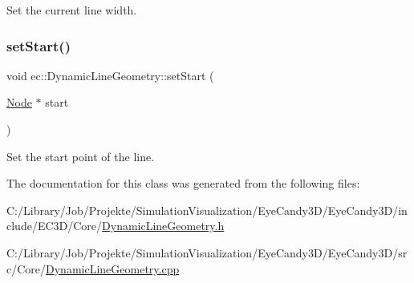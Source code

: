 Set the current line width. 

\mbox{\label{classec_1_1_dynamic_line_geometry_a7354615fc961c1d6d6e9ec09bdb5bdf9}} 
\subsubsection{\texorpdfstring{set\+Start()}{setStart()}}
{\footnotesize\ttfamily void ec\+::\+Dynamic\+Line\+Geometry\+::set\+Start (\begin{DoxyParamCaption}\item[{\mbox{\hyperlink{classec_1_1_node}{Node}} $\ast$}]{start }\end{DoxyParamCaption})}



Set the start point of the line. 



The documentation for this class was generated from the following files\+:\begin{DoxyCompactItemize}
\item 
C\+:/\+Library/\+Job/\+Projekte/\+Simulation\+Visualization/\+Eye\+Candy3\+D/\+Eye\+Candy3\+D/include/\+E\+C3\+D/\+Core/\mbox{\hyperlink{_dynamic_line_geometry_8h}{Dynamic\+Line\+Geometry.\+h}}\item 
C\+:/\+Library/\+Job/\+Projekte/\+Simulation\+Visualization/\+Eye\+Candy3\+D/\+Eye\+Candy3\+D/src/\+Core/\mbox{\hyperlink{_dynamic_line_geometry_8cpp}{Dynamic\+Line\+Geometry.\+cpp}}\end{DoxyCompactItemize}
